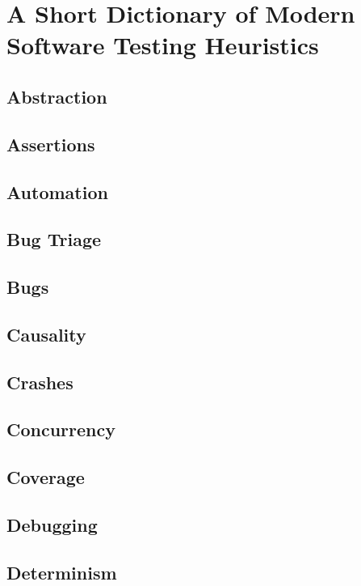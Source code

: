 \chapter{A Short Dictionary of Modern Software Testing Heuristics}

\section{Abstraction}

\section{Assertions}

\section{Automation}

\section{Bug Triage}

\section{Bugs}

\section{Causality}

\section{Crashes}

\section{Concurrency}

\section{Coverage}

\section{Debugging}

\section{Determinism}

